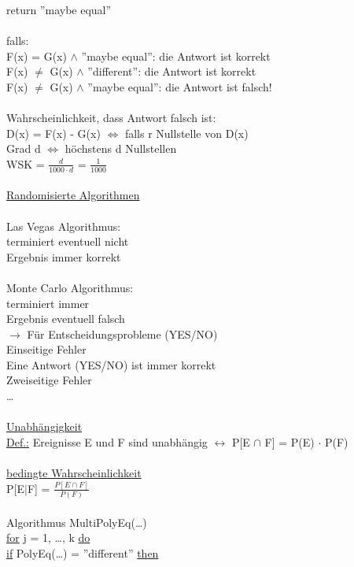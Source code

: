 \documentclass{article}
\begin{document}
 return ''maybe equal'' \\
 \\
 falls: \\
 F(x) = G(x) $\wedge$ ''maybe equal'': die Antwort ist korrekt \\
 F(x) $\neq$ G(x) $\wedge$ ''different'': die Antwort ist korrekt \\
 F(x) $\neq$ G(x) $\wedge$ ''maybe equal'': die Antwort ist falsch!\\
 \\
 Wahrscheinlichkeit, dass Antwort falsch ist: \\
 D(x) = F(x) - G(x) $\Leftrightarrow$ falls r Nullstelle von D(x) \\
 Grad d $\Leftrightarrow$ h\"ochstens d Nullstellen\\
 WSK = $\frac{d}{1000 \cdot d}$ = $\frac{1}{1000}$ \\
 \\
 \underline{Randomisierte Algorithmen} \\
 \\
 Las Vegas Algorithmus: \\
 terminiert eventuell nicht \\
 Ergebnis immer korrekt \\
 \\
 Monte Carlo Algorithmus: \\
 terminiert immer \\
 Ergebnis eventuell falsch \\
 $\rightarrow$ F\"ur Entscheidungsprobleme (YES/NO) \\
 Einseitige Fehler \\
 Eine Antwort (YES/NO) ist immer korrekt \\
 Zweiseitige Fehler \\
 \ldots \\
 \\
 \underline{Unabh\"angigkeit} \\
 \underline{Def.:} Ereignisse E und F sind unabh\"angig $\leftrightarrow$ P[E $\cap$ F] = P(E) $\cdot$ P(F) \\
 \\
 \underline{bedingte Wahrscheinlichkeit} \\
 P[E$\mid$F] = $\frac{P[E \cap F]}{P(F)}$ \\
 \\
 Algorithmus MultiPolyEq(\ldots) \\
 \underline{for} j = 1, \ldots, k \underline{do} \\
 \underline{if} PolyEq(\ldots) = ''different'' \underline{then} \\
\end{document}
